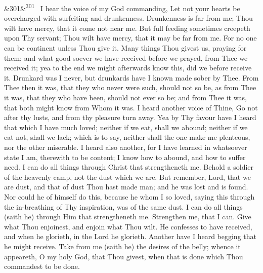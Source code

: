 \documentclass[12pt]{article}
\newcommand{\para}[1][]{\par\noindent\ifx&#1&\else\textsuperscript{\footnotesize #1}~\fi}
\begin{document}
\para[301] I hear the voice of my God commanding, Let not your hearts be overcharged with surfeiting and drunkenness. Drunkenness is far from me; Thou wilt have mercy, that it come not near me. But full feeding sometimes creepeth upon Thy servant; Thou wilt have mercy, that it may be far from me. For no one can be continent unless Thou give it. Many things Thou givest us, praying for them; and what good soever we have received before we prayed, from Thee we received it; yea to the end we might afterwards know this, did we before receive it. Drunkard was I never, but drunkards have I known made sober by Thee. From Thee then it was, that they who never were such, should not so be, as from Thee it was, that they who have been, should not ever so be; and from Thee it was, that both might know from Whom it was. I heard another voice of Thine, Go not after thy lusts, and from thy pleasure turn away. Yea by Thy favour have I heard that which I have much loved; neither if we eat, shall we abound; neither if we eat not, shall we lack; which is to say, neither shall the one make me plenteous, nor the other miserable. I heard also another, for I have learned in whatsoever state I am, therewith to be content; I know how to abound, and how to suffer need. I can do all things through Christ that strengtheneth me. Behold a soldier of the heavenly camp, not the dust which we are. But remember, Lord, that we are dust, and that of dust Thou hast made man; and he was lost and is found. Nor could he of himself do this, because he whom I so loved, saying this through the in-breathing of Thy inspiration, was of the same dust. I can do all things (saith he) through Him that strengtheneth me. Strengthen me, that I can. Give what Thou enjoinest, and enjoin what Thou wilt. He confesses to have received, and when he glorieth, in the Lord he glorieth. Another have I heard begging that he might receive. Take from me (saith he) the desires of the belly; whence it appeareth, O my holy God, that Thou givest, when that is done which Thou commandest to be done.
\end{document}

